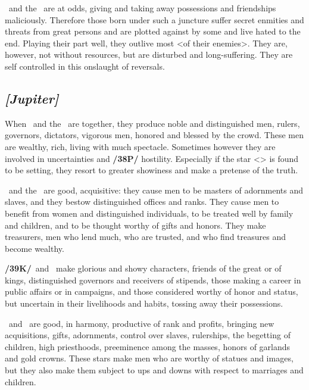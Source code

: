 \Saturn\, and the \Sun\, are at odds, giving and taking away possessions and friendships maliciously. Therefore those born under such a juncture suffer secret enmities and threats from great persons and are plotted against by some and live hated to the end. Playing their part well, they outlive most <of their enemies>. They are, however, not without resources, but are disturbed and long-suffering. They are self controlled in this onslaught of reversals.

\secbr
{}
\subsection{\textit{[Jupiter]}}
When \Jupiter\, and the \Sun\, are together, they produce noble and distinguished men, rulers, governors,
dictators, vigorous men, honored and blessed by the crowd. These men are wealthy, rich, living with much spectacle. Sometimes however they are involved in uncertainties and \textbf{/38P/} hostility. Especially if the star <\Jupiter> is found to be setting, they resort to greater showiness and make a pretense of the truth.

\Jupiter\, and the \Moon\, are good, acquisitive: they cause men to be masters of adornments and slaves, and they bestow distinguished offices and ranks. They cause men to benefit from women and distinguished individuals, to be treated well by family and children, and to be thought worthy of gifts and honors. They make treasurers, men who lend much, who are trusted, and who find treasures and become wealthy.

\textbf{/39K/}\Jupiter\, and \Mars\, make glorious and showy characters, friends of the great or of kings,
distinguished governors and receivers of stipends, those making a career in public affairs or in campaigns, and those considered worthy of honor and status, but uncertain in their livelihoods and habits, tossing away their possessions.

\Jupiter\, and \Venus\, are good, in harmony, productive of rank and profits, bringing new acquisitions,
gifts, adornments, control over slaves, rulerships, the begetting of children, high priesthoods, preeminence among the masses, honors of garlands and gold crowns. These stars make men who are worthy of statues and images, but they also make them subject to ups and downs with respect to marriages and children.

